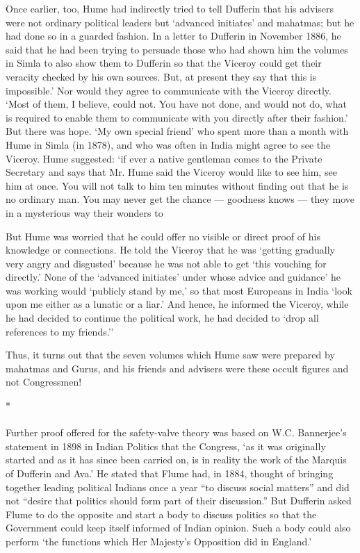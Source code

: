 \begin{multicols}{2}
Once earlier, too, Hume had indirectly tried to tell Dufferin that his advisers were not ordinary political leaders but `advanced initiates' and mahatmas; but he had done so in a guarded fashion. In a letter to Dufferin in November 1886, he said that he had been trying to persuade those who had shown him the volumes in Simla to also show them to Dufferin so that the Viceroy could get their veracity checked by his own sources. But, at present they say that this is impossible.' Nor would they agree to communicate with the Viceroy directly. `Most of them, I believe, could not. You have not done, and would not do, what is required to enable them to communicate with you directly after their fashion.' But there was hope. `My own special friend' who spent more than a month with Hume in Simla (in 1878), and who was often in India might agree to see the Viceroy. Hume suggested: `if ever a native gentleman comes to the Private Secretary and says that Mr. Hume said the Viceroy would like to see him, see him at once. You will not talk to him ten minutes without finding out that he is no ordinary man. You may never get the chance --- goodness knows --- they move in a mysterious way their wonders to

But Hume was worried that he could offer no visible or direct proof of his knowledge or connections. He told the Viceroy that he was `getting gradually very angry and disgusted' because he was not able to get `this vouching for directly.' None of the `advanced initiates' under whose advice and guidance' he was working would `publicly stand by me,' so that most Europeans in India `look upon me either as a lunatic or a liar.' And hence, he informed the Viceroy, while he had decided to continue the political work, he had decided to `drop all references to my friends.''

Thus, it turns out that the seven volumes which Hume saw were prepared by mahatmas and Gurus, and his friends and advisers were these occult figures and not Congressmen!

\begin{center}*\end{center}

\paragraph*{}
Further proof offered for the safety-valve theory was based on W.C. Bannerjee's statement in 1898 in Indian Politics that the Congress, `as it was originally started and as it has since been carried on, is in reality the work of the Marquis of Dufferin and Ava.' He stated that Flume had, in 1884, thought of bringing together leading political Indians once a year ``to discuss social matters'' and did not ``desire that politics should form part of their discussion.'' But Dufferin asked Flume to do the opposite and start a body to discuss politics so that the Government could keep itself informed of Indian opinion. Such a body could also perform `the functions which Her Majesty's Opposition did in England.'


\end{multicols}
